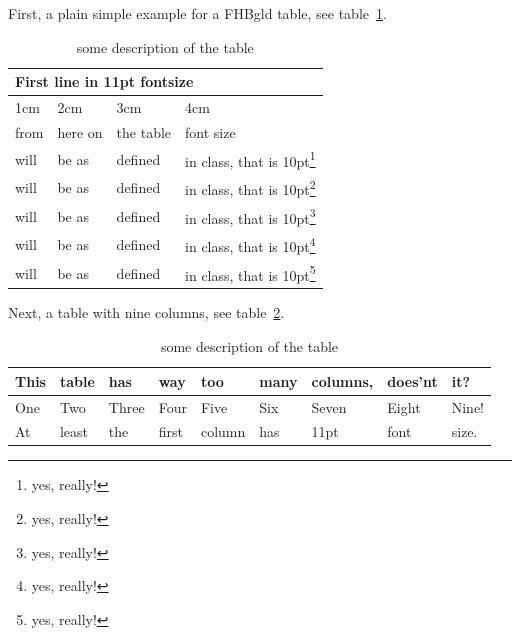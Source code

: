 First, a plain simple example for a FHBgld table, see table~\hyperref[tab:tab:tableexample1]{\ref{tab:tableexample1}}.

\begin{table}[h]
	\centering
	\begin{tabular}{|b{1cm}|b{2cm}|b{3cm}|b{4cm}|}
		\hline
		\multicolumn{4}{|l|}{\fontsize{11pt}{12pt}\selectfont\noindent First line in 11pt fontsize } \\ \hline
		1cm & 2cm & 3cm & 4cm \\ \hline
		from & here on & the table & font size \\ \hline
		will & be as & defined & in class, that is 10pt\footnote{yes, really!} \\ \hline
		will & be as & defined & in class, that is 10pt\footnote{yes, really!} \\ \hline
		will & be as & defined & in class, that is 10pt\footnote{yes, really!} \\ \hline
		will & be as & defined & in class, that is 10pt\footnote{yes, really!} \\ \hline
		will & be as & defined & in class, that is 10pt\footnote{yes, really!} \\ \hline
	\end{tabular}
	\caption{some description of the table}
\label{tab:tableexample1}
\end{table}

Next, a table with nine columns, see table~\hyperref[tab:tableexample2]{\ref{tab:tableexample2}}.

\begin{table}[h]
	\centering
	\begin{tabular}{|*{9}{l|}}
		\hline
		{\fontsize{11pt}{12pt}\selectfont This} & {\fontsize{11pt}{12pt}\selectfont table} & {\fontsize{11pt}{12pt}\selectfont has} & {\fontsize{11pt}{12pt}\selectfont way} & {\fontsize{11pt}{12pt}\selectfont too } & {\fontsize{11pt}{12pt}\selectfont many} & {\fontsize{11pt}{12pt}\selectfont columns}, & {\fontsize{11pt}{12pt}\selectfont does'nt} & {\fontsize{11pt}{12pt}\selectfont it?} \\ \hline
		One & Two & Three & Four & Five & Six & Seven & Eight & Nine! \\ \hline
		At & least & the & first & column & has & 11pt & font & size. \\ \hline
	\end{tabular}
	\caption{some description of the table}
	\label{tab:tableexample2}
\end{table}

